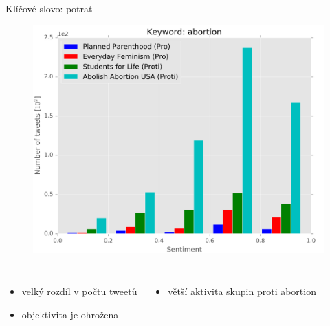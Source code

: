 \documentclass[notheorems,12pt]{beamer}
\begin{document}
\begin{frame}{Klíčové slovo: potrat}
    \begin{figure}
        \centering
        \includegraphics[scale=0.37]{./Pics/abortion.png}
    \end{figure}
    \vspace{-0.4cm}
    \begin{columns}
    \column{6cm}
    	\begin{itemize}
    		\item velký rozdíl v počtu tweetů
            \item objektivita je ohrožena
    	\end{itemize}
    \column{6cm}
    	\begin{itemize}
    		\item větší aktivita skupin proti abortion
    	\end{itemize}
    \end{columns}
\end{frame}
\end{document}
